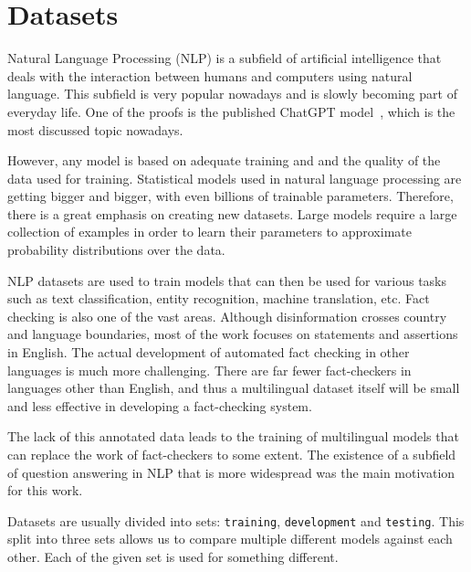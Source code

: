 
\chapter{Datasets}\label{c3}
Natural Language Processing (NLP) is a subfield of artificial intelligence that deals with the interaction between humans and computers using natural language. This subfield is very popular nowadays and is slowly becoming part of everyday life. One of the proofs is the published ChatGPT model~\cite{gpt}, which is the most discussed topic nowadays.

However, any model is based on adequate training and and the quality of the data used for training. Statistical models used in natural language processing are getting bigger and bigger, with even billions of trainable parameters. Therefore, there is a great emphasis on creating new datasets. Large models require a large collection of examples in order to learn their parameters to approximate probability distributions over the data. 

NLP datasets are used to train models that can then be used for various tasks such as text classification, entity recognition, machine translation, etc. Fact checking is also one of the vast areas. Although disinformation crosses country and language boundaries, most of the work focuses on statements and assertions in English. The actual development of automated fact checking in other languages is much more challenging. There are far fewer fact-checkers in languages other than English, and thus a multilingual dataset itself will be small and less effective in developing a fact-checking system.

The lack of this annotated data leads to the training of multilingual models that can replace the work of fact-checkers to some extent. The existence of a subfield of question answering in NLP that is more widespread was the main motivation for this work.

Datasets are usually divided into sets: \texttt{training}, \texttt{development} and \texttt{testing}. This split into three sets allows us to compare multiple different models against each other. Each of the given set is used for something different.

